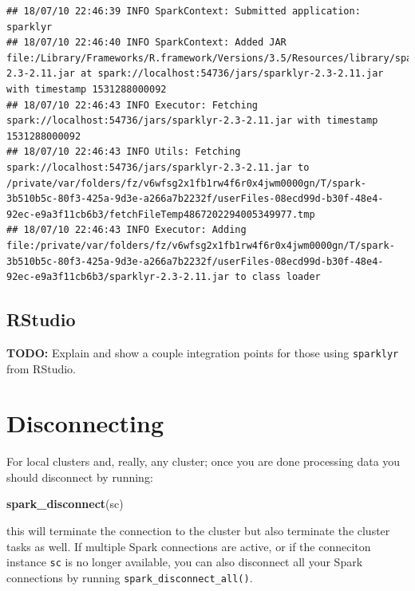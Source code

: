 \documentclass[]{book}
\newenvironment{Shaded}{\begin{snugshade}}{\end{snugshade}}
\newcommand{\KeywordTok}[1]{\textcolor[rgb]{0.13,0.29,0.53}{\textbf{#1}}}
\newcommand{\NormalTok}[1]{#1}
\theoremstyle{definition}
\theoremstyle{definition}
\theoremstyle{definition}
\theoremstyle{remark}
\begin{document}
\begin{verbatim}
## 18/07/10 22:46:39 INFO SparkContext: Submitted application: sparklyr
## 18/07/10 22:46:40 INFO SparkContext: Added JAR file:/Library/Frameworks/R.framework/Versions/3.5/Resources/library/sparklyr/java/sparklyr-2.3-2.11.jar at spark://localhost:54736/jars/sparklyr-2.3-2.11.jar with timestamp 1531288000092
## 18/07/10 22:46:43 INFO Executor: Fetching spark://localhost:54736/jars/sparklyr-2.3-2.11.jar with timestamp 1531288000092
## 18/07/10 22:46:43 INFO Utils: Fetching spark://localhost:54736/jars/sparklyr-2.3-2.11.jar to /private/var/folders/fz/v6wfsg2x1fb1rw4f6r0x4jwm0000gn/T/spark-3b510b5c-80f3-425a-9d3e-a266a7b2232f/userFiles-08ecd99d-b30f-48e4-92ec-e9a3f11cb6b3/fetchFileTemp4867202294005349977.tmp
## 18/07/10 22:46:43 INFO Executor: Adding file:/private/var/folders/fz/v6wfsg2x1fb1rw4f6r0x4jwm0000gn/T/spark-3b510b5c-80f3-425a-9d3e-a266a7b2232f/userFiles-08ecd99d-b30f-48e4-92ec-e9a3f11cb6b3/sparklyr-2.3-2.11.jar to class loader
\end{verbatim}

\hypertarget{using-spark-from-rstudio}{%
\subsection{RStudio}\label{using-spark-from-rstudio}}

\textbf{TODO:} Explain and show a couple integration points for those
using \texttt{sparklyr} from RStudio.

\hypertarget{disconnecting}{%
\section{Disconnecting}\label{disconnecting}}

For local clusters and, really, any cluster; once you are done
processing data you should disconnect by running:

\begin{Shaded}
\begin{Highlighting}[]
\KeywordTok{spark_disconnect}\NormalTok{(sc)}
\end{Highlighting}
\end{Shaded}

this will terminate the connection to the cluster but also terminate the
cluster tasks as well. If multiple Spark connections are active, or if
the conneciton instance \texttt{sc} is no longer available, you can also
disconnect all your Spark connections by running
\texttt{spark\_disconnect\_all()}.
\end{document}
